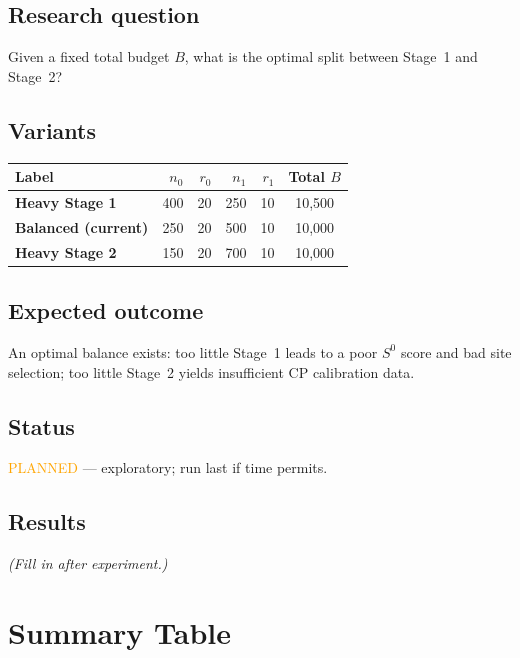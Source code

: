 \documentclass[11pt]{article}
\begin{document}
\subsection*{Research question}
Given a fixed total budget $B$, what is the optimal split between
Stage~1 and Stage~2?

\subsection*{Variants}

\begin{center}
\begin{tabular}{lrrrrc}
  \toprule
  Label & $n_0$ & $r_0$ & $n_1$ & $r_1$ & Total $B$ \\
  \midrule
  \textbf{Heavy Stage 1} & 400 & 20 & 250 & 10 & 10{,}500 \\
  \textbf{Balanced (current)} & 250 & 20 & 500 & 10 & 10{,}000 \\
  \textbf{Heavy Stage 2} & 150 & 20 & 700 & 10 & 10{,}000 \\
  \bottomrule
\end{tabular}
\end{center}

\subsection*{Expected outcome}
An optimal balance exists:
too little Stage~1 leads to a poor $S^0$ score and bad site selection;
too little Stage~2 yields insufficient CP calibration data.

\subsection*{Status}
\textcolor{orange}{PLANNED} --- exploratory; run last if time permits.

\subsection*{Results}
\textit{(Fill in after experiment.)}

\section{Summary Table}
\label{sec:summary}
\end{document}
